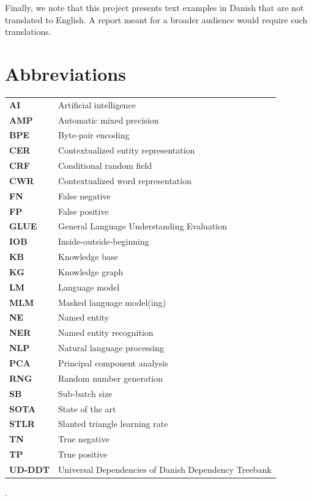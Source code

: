 \documentclass[12pt, fleqn]{report}
\newcommand{\abbrv}[2]{\vspace{0.1cm}\textbf{#1} & #2\\}
\begin{document}
Finally, we note that this project presents text examples in Danish that are not translated to English.
A report meant for a broader audience would require such translations.

\chapter*{Abbreviations}
\begin{table}[H]
    \begin{tabular}{@{}l l}
        \abbrv{AI}{Artificial intelligence}
        \abbrv{AMP}{Automatic mixed precision}
        \abbrv{BPE}{Byte-pair encoding}
        \abbrv{CER}{Contextualized entity representation}
        \abbrv{CRF}{Conditional random field}
        \abbrv{CWR}{Contextualized word representation}
        \abbrv{FN}{False negative}
        \abbrv{FP}{False positive}
        \abbrv{GLUE}{General Language Understanding Evaluation}
        \abbrv{IOB}{Inside-outside-beginning}
        \abbrv{KB}{Knowledge base}
        \abbrv{KG}{Knowledge graph}
        \abbrv{LM}{Language model}
        \abbrv{MLM}{Masked language model(ing)}
        \abbrv{NE}{Named entity}
        \abbrv{NER}{Named entity recognition}
        \abbrv{NLP}{Natural language processing}
        \abbrv{PCA}{Principal component analysis}
        \abbrv{RNG}{Random number generation}
        \abbrv{SB}{Sub-batch size}
        \abbrv{SOTA}{State of the art}
        \abbrv{STLR}{Slanted triangle learning rate}
        \abbrv{TN}{True negative}
        \abbrv{TP}{True positive}
        \abbrv{UD-DDT}{Universal Dependencies of Danish Dependency Treebank}
    \end{tabular}
\end{table}\noindent

\tableofcontents

\setlength{\headheight}{15pt}
\addtolength{\topmargin}{-2.5pt}.















\renewcommand*{\bibfont}{\normalfont\footnotesize}
\printbibliography[heading=bibintoc]

\appendix

\end{document}

